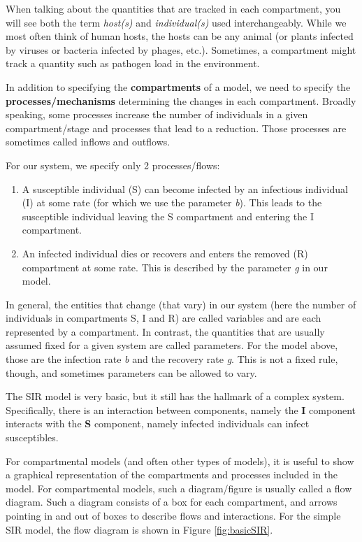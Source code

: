 \documentclass[]{book}
\providecommand{\tightlist}{%
  \setlength{\itemsep}{0pt}\setlength{\parskip}{0pt}}
\theoremstyle{definition}
\theoremstyle{definition}
\theoremstyle{definition}
\theoremstyle{remark}
\begin{document}
When talking about the quantities that are tracked in each compartment,
you will see both the term \emph{host(s)} and \emph{individual(s)} used
interchangeably. While we most often think of human hosts, the hosts can
be any animal (or plants infected by viruses or bacteria infected by
phages, etc.). Sometimes, a compartment might track a quantity such as
pathogen load in the environment.

In addition to specifying the \textbf{compartments} of a model, we need
to specify the \textbf{processes/mechanisms} determining the changes in
each compartment. Broadly speaking, some processes increase the number
of individuals in a given compartment/stage and processes that lead to a
reduction. Those processes are sometimes called inflows and outflows.

For our system, we specify only 2 processes/flows:

\begin{enumerate}
\def\labelenumi{\arabic{enumi}.}
\tightlist
\item
  A susceptible individual (S) can become infected by an infectious
  individual (I) at some rate (for which we use the parameter \emph{b}).
  This leads to the susceptible individual leaving the S compartment and
  entering the I compartment.\\
\item
  An infected individual dies or recovers and enters the removed (R)
  compartment at some rate. This is described by the parameter \emph{g}
  in our model.
\end{enumerate}

In general, the entities that change (that vary) in our system (here the
number of individuals in compartments S, I and R) are called variables
and are each represented by a compartment. In contrast, the quantities
that are usually assumed fixed for a given system are called parameters.
For the model above, those are the infection rate \emph{b} and the
recovery rate \emph{g}. This is not a fixed rule, though, and sometimes
parameters can be allowed to vary.

The SIR model is very basic, but it still has the hallmark of a complex
system. Specifically, there is an interaction between components, namely
the \textbf{I} component interacts with the \textbf{S} component, namely
infected individuals can infect susceptibles.

For compartmental models (and often other types of models), it is useful
to show a graphical representation of the compartments and processes
included in the model. For compartmental models, such a diagram/figure
is usually called a flow diagram. Such a diagram consists of a box for
each compartment, and arrows pointing in and out of boxes to describe
flows and interactions. For the simple SIR model, the flow diagram is
shown in Figure \ref{fig:basicSIR}.
\end{document}
